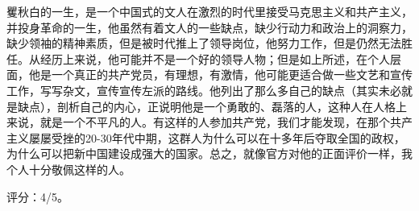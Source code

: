 矍秋白的一生，是一个中国式的文人在激烈的时代里接受马克思主义和共产主义，并投身革命的一生，他虽然有着文人的一些缺点，缺少行动力和政治上的洞察力，缺少领袖的精神素质，但是被时代推上了领导岗位，他努力工作，但是仍然无法胜任。从经历上来说，他可能并不是一个好的领导人物；但是如上所述，在个人层面，他是一个真正的共产党员，有理想，有激情，他可能更适合做一些文艺和宣传工作，写写杂文，宣传宣传左派的路线。他列出了那么多自己的缺点（其实未必就是缺点），剖析自己的内心，正说明他是一个勇敢的、磊落的人，这种人在人格上来说，就是一个不平凡的人。有这样的人参加共产党，我们才能发现，在那个共产主义屡屡受挫的20-30年代中期，这群人为什么可以在十多年后夺取全国的政权，为什么可以把新中国建设成强大的国家。总之，就像官方对他的正面评价一样，我个人十分敬佩这样的人。

评分：4/5。